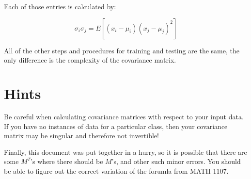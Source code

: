 \documentclass{article}
\begin{document}
Each of those entries is calculated by:

\begin{displaymath}
 \sigma_i\sigma_j = E [{(x_i - \mu_i)(x_j - \mu_j)}^2]
\end{displaymath}

All of the other steps and procedures for training and testing are the same, the only difference is the complexity of the covariance matrix.


\section{Hints}
\label{sec:hints}

Be careful when calculating covariance matrices with respect to your input data. If you have no instances of data for a particular class, then your covariance matrix may be singular and therefore not invertible!

Finally, this document was put together in a hurry, so it is possible that there are some $M^T$'s where there should be $M$'s, and other such minor errors.  You should be able to figure out the correct variation of the forumla from MATH 1107.
\end{document}
